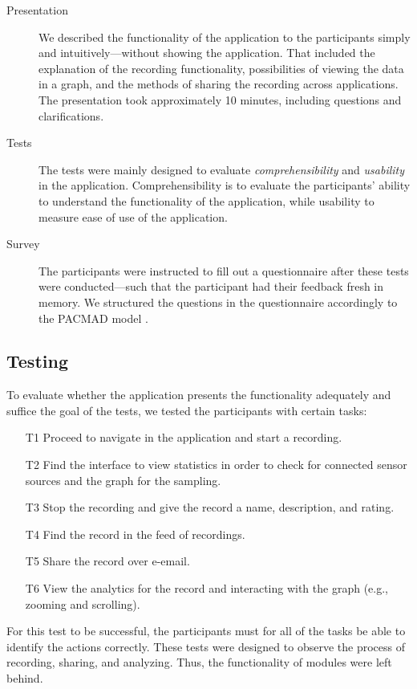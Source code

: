 \begin{description}
    \item[Presentation] We described the functionality of the application to the participants simply and intuitively---without showing the application. That included the explanation of the recording functionality, possibilities of viewing the data in a graph, and the methods of sharing the recording across applications. The presentation took approximately 10 minutes, including questions and clarifications.  
    \item[Tests] The tests were mainly designed to evaluate \textit{comprehensibility} and \textit{usability} in the application. Comprehensibility is to evaluate the participants' ability to understand the functionality of the application, while usability to measure ease of use of the application.
    \item[Survey] The participants were instructed to fill out a questionnaire after these tests were conducted---such that the participant had their feedback fresh in memory. We structured the questions in the questionnaire accordingly to the PACMAD model \cite{pacmad}. 
\end{description}

\subsection{Testing}
To evaluate whether the application presents the functionality adequately and suffice the goal of the tests, we tested the participants with certain tasks:
\begin{itemize}
    \item[T1] Proceed to navigate in the application and start a recording.
    \item[T2] Find the interface to view statistics in order to check for connected sensor sources and the graph for the sampling.
    \item[T3] Stop the recording and give the record a name, description, and rating.
    \item[T4] Find the record in the feed of recordings. 
    \item[T5] Share the record over e-email.
    \item[T6] View the analytics for the record and interacting with the graph (e.g., zooming and scrolling). 
\end{itemize}

For this test to be successful, the participants must for all of the tasks be able to identify the actions correctly. These tests were designed to observe the process of recording, sharing, and analyzing. Thus, the functionality of modules were left behind. 


